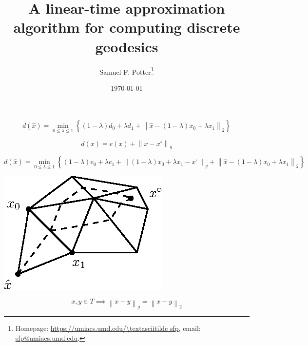 \documentclass[12pt]{article}
\title{A linear-time approximation algorithm for computing discrete
  geodesics}
\author{Samuel F. Potter\footnote{Homepage:
    \url{https://umiacs.umd.edu/\textasciitilde sfp}, email:
    \url{sfp@umiacs.umd.edu}.}}
\date{\today}
\newcommand{\curlyb}[1]{\left\{#1\right\}}
\newcommand{\norm}[1]{\left\|#1\right\|}
\begin{document}
\maketitle

\begin{equation}
  d(\hat{x}) = \min_{0 \leq \lambda \leq 1} \curlyb{(1 - \lambda) d_0 + \lambda d_1 + \norm{\hat{x} - (1 - \lambda)x_0 + \lambda x_1}_2}
\end{equation}

\begin{equation}
  d(x) = e(x) + \norm{x - x^\circ}_g
\end{equation}

\begin{equation}
  d(\hat{x}) = \min_{0 \leq \lambda \leq 1} \curlyb{(1 - \lambda) e_0 + \lambda e_1 + \norm{(1 - \lambda)x_0 + \lambda x_1 - x^\circ}_g + \norm{\hat{x} - (1 - \lambda)x_0 + \lambda x_1}_2}
\end{equation}

\begin{center}
  \includegraphics{nonunique.eps}
\end{center}

\begin{equation}
  x, y \in T \implies \norm{x - y}_g = \norm{x - y}_2
\end{equation}
\end{document}
